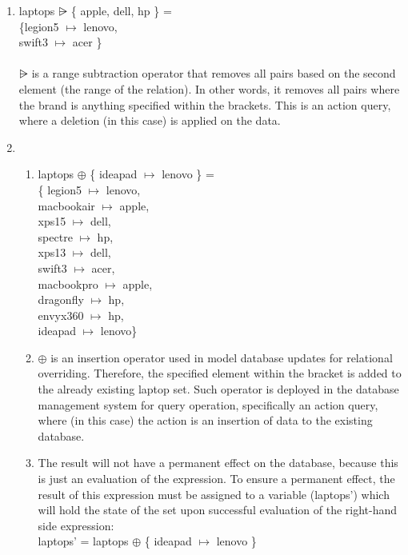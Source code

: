 \begin{enumerate}
\item laptops $\nrres$ \{ apple, dell, hp \} = \\
\{legion5 $\mapsto$ lenovo, \\
swift3 $\mapsto$ acer \}
\\ \\
$\nrres$ is a range subtraction operator that removes all pairs based on the second element (the range of the relation). In other words, it removes all pairs where the brand is anything specified within the brackets. This is an action query, where a deletion (in this case) is applied on the data.\\

\item 
\begin {enumerate} 
\item laptops $\oplus$ \{ ideapad $\mapsto$ lenovo \} = \\
\{ legion5 $\mapsto$ lenovo, \\
macbookair $\mapsto$ apple, \\
xps15 $\mapsto$ dell, \\
spectre $\mapsto$ hp, \\
xps13 $\mapsto$ dell, \\
swift3 $\mapsto$ acer, \\
macbookpro $\mapsto$ apple, \\
dragonfly $\mapsto$ hp, \\
envyx360 $\mapsto$ hp, \\
ideapad $\mapsto$ lenovo\} \\

\item $\oplus$ is an insertion operator used in model database updates for relational overriding. Therefore, the specified element within the bracket is added to the already existing laptop set. Such operator is deployed in the database management system for query operation, specifically an action query, where (in this case) the action is an insertion of data to the existing database.  \\

\item The result will not have a permanent effect on the database, because this is just an  evaluation of the expression. To ensure a permanent effect, the result of this expression must be assigned to a variable (laptops') which will hold the state of the set upon successful evaluation of the right-hand side expression: \\
laptops' = laptops $\oplus$ \{ ideapad $\mapsto$ lenovo \}
\end{enumerate}

\end{enumerate}

